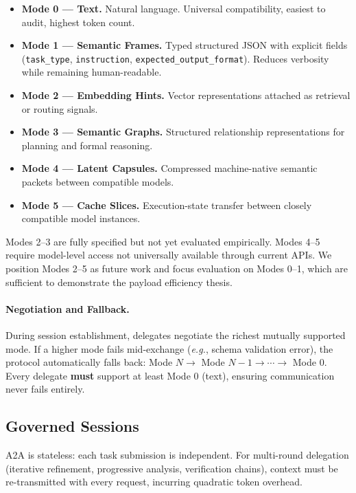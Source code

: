\documentclass[11pt,a4paper]{article}
\newcommand{\atoa}{\textsc{A2A}}
\newcommand{\eg}{\textit{e.g.}}
\begin{document}
\begin{itemize}[leftmargin=*]
\item \textbf{Mode 0 --- Text.} Natural language. Universal compatibility, easiest to audit, highest token count.
\item \textbf{Mode 1 --- Semantic Frames.} Typed structured JSON with explicit fields (\texttt{task\_type}, \texttt{instruction}, \texttt{expected\_output\_format}). Reduces verbosity while remaining human-readable.
\item \textbf{Mode 2 --- Embedding Hints.} Vector representations attached as retrieval or routing signals.
\item \textbf{Mode 3 --- Semantic Graphs.} Structured relationship representations for planning and formal reasoning.
\item \textbf{Mode 4 --- Latent Capsules.} Compressed machine-native semantic packets between compatible models.
\item \textbf{Mode 5 --- Cache Slices.} Execution-state transfer between closely compatible model instances.
\end{itemize}

Modes 2--3 are fully specified but not yet evaluated empirically. Modes 4--5 require model-level access not universally available through current APIs. We position Modes 2--5 as future work and focus evaluation on Modes 0--1, which are sufficient to demonstrate the payload efficiency thesis.

\paragraph{Negotiation and Fallback.} During session establishment, delegates negotiate the richest mutually supported mode. If a higher mode fails mid-exchange (\eg{}, schema validation error), the protocol automatically falls back: Mode $N \rightarrow$ Mode $N{-}1 \rightarrow \cdots \rightarrow$ Mode 0. Every delegate \textbf{must} support at least Mode 0 (text), ensuring communication never fails entirely.

\subsection{Governed Sessions}
\label{sec:sessions}

\atoa{} is stateless: each task submission is independent. For multi-round delegation (iterative refinement, progressive analysis, verification chains), context must be re-transmitted with every request, incurring quadratic token overhead.
\end{document}
